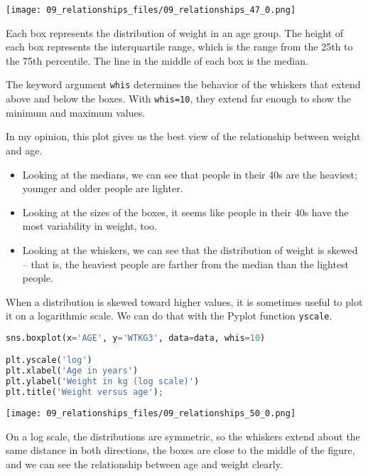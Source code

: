 \begin{center}
\texttt{[image: 09\_relationships\_files/09\_relationships\_47\_0.png]}
\end{center}

Each box represents the distribution of weight in an age group. The
height of each box represents the interquartile range, which is the
range from the 25th to the 75th percentile. The line in the middle of
each box is the median.

The keyword argument \passthrough{\lstinline!whis!} determines the
behavior of the whiskers that extend above and below the boxes. With
\passthrough{\lstinline!whis=10!}, they extend far enough to show the
minimum and maximum values.

In my opinion, this plot gives us the best view of the relationship
between weight and age.

\begin{itemize}
\item
  Looking at the medians, we can see that people in their 40s are the
  heaviest; younger and older people are lighter.
\item
  Looking at the sizes of the boxes, it seems like people in their 40s
  have the most variability in weight, too.
\item
  Looking at the whiskers, we can see that the distribution of weight is
  skewed -- that is, the heaviest people are farther from the median
  than the lightest people.
\end{itemize}

When a distribution is skewed toward higher values, it is sometimes
useful to plot it on a logarithmic scale. We can do that with the Pyplot
function \passthrough{\lstinline!yscale!}.

\begin{lstlisting}[language=Python,style=source]
sns.boxplot(x='AGE', y='WTKG3', data=data, whis=10)

plt.yscale('log')
plt.xlabel('Age in years')
plt.ylabel('Weight in kg (log scale)')
plt.title('Weight versus age');
\end{lstlisting}

\begin{center}
\texttt{[image: 09\_relationships\_files/09\_relationships\_50\_0.png]}
\end{center}

On a log scale, the distributions are symmetric, so the whiskers extend
about the same distance in both directions, the boxes are close to the
middle of the figure, and we can see the relationship between age and
weight clearly.

